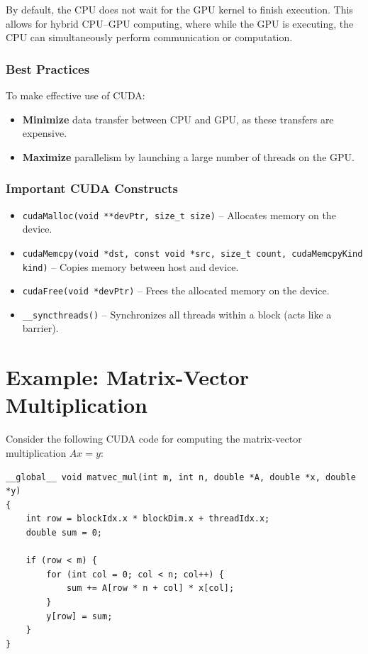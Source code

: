 \documentclass[12pt]{book}
\begin{document}
By default, the CPU does not wait for the GPU kernel to finish execution. This allows for hybrid CPU–GPU computing, where while the GPU is executing, the CPU can simultaneously perform communication or computation.

\subsubsection*{Best Practices}
To make effective use of CUDA:

\begin{itemize}
    \item \textbf{Minimize} data transfer between CPU and GPU, as these transfers are expensive.
    \item \textbf{Maximize} parallelism by launching a large number of threads on the GPU.
\end{itemize}

\subsubsection*{Important CUDA Constructs}
\begin{itemize}
    \item \texttt{cudaMalloc(void **devPtr, size\_t size)} – Allocates memory on the device.
    \item \texttt{cudaMemcpy(void *dst, const void *src, size\_t count, cudaMemcpyKind kind)} – Copies memory between host and device.
    \item \texttt{cudaFree(void *devPtr)} – Frees the allocated memory on the device.
    \item \texttt{\_\_syncthreads()} – Synchronizes all threads within a block (acts like a barrier).
\end{itemize}

\section{Example: Matrix-Vector Multiplication}

Consider the following CUDA code for computing the matrix-vector multiplication $Ax = y$:

\begin{lstlisting}[style=cppstyle]
__global__ void matvec_mul(int m, int n, double *A, double *x, double *y)
{
    int row = blockIdx.x * blockDim.x + threadIdx.x;
    double sum = 0;

    if (row < m) {
        for (int col = 0; col < n; col++) {
            sum += A[row * n + col] * x[col];
        }
        y[row] = sum;
    }
}
\end{lstlisting}
\end{document}
